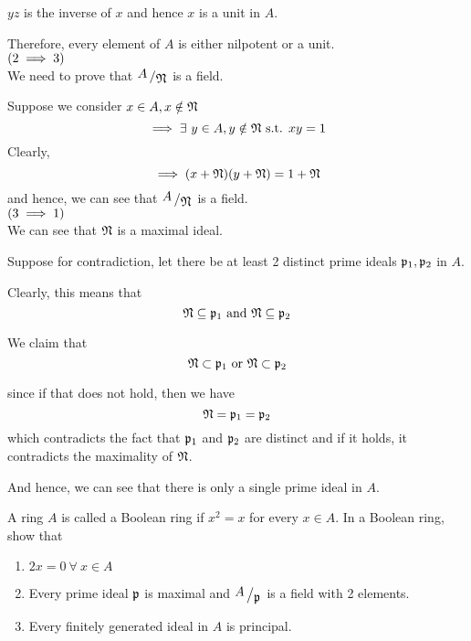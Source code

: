\(yz\) is the inverse of \(x\) and hence \(x\) is a unit in \(A\).

Therefore, every element of \(A\) is either nilpotent or a unit. \\


\(\left( 2 \implies 3 \right)\) \\
We need to prove that \(\bigslant{A}{\mfN}\) is a field.

Suppose we consider \(x \in A, x \notin \mathfrak{N}\)
\[
	\implies \exists\ y \in A, y \notin \mathfrak{N} \text{ s.t. } xy = 1
\]
Clearly,
\[
	\implies (x + \mathfrak{N})(y + \mathfrak{N}) = 1 + \mathfrak{N}
\]
and hence, we can see that \(\bigslant{A}{\mfN}\) is a field. \\


\(\left( 3 \implies 1 \right)\) \\
We can see that \(\mathfrak{N}\) is a maximal ideal.

Suppose for contradiction, let there be at least 2 distinct prime ideals
\( \mathfrak{p}_1, \mathfrak{p}_2 \) in \(A\).

Clearly, this means that
\[
	\mathfrak{N} \subseteq \mathfrak{p}_1 \text{ and } \mathfrak{N} \subseteq \mathfrak{p}_2
\]

We claim that
\[
	\mathfrak{N} \subset \mathfrak{p}_1 \text{ or } \mathfrak{N} \subset \mathfrak{p}_2
\]

since if that does not hold, then we have
\[
	\mathfrak{N} = \mathfrak{p}_1 = \mathfrak{p}_2
\]
which contradicts the fact that \( \mathfrak{p}_1 \) and \( \mathfrak{p}_2 \) are distinct
and if it holds, it contradicts the maximality of \(\mathfrak{N}\).

And hence, we can see that there is only a single prime ideal in \(A\).


\begin{exercise}{}{}
	A ring \(A\) is called a Boolean ring if \(x^2 = x\) for every
	\(x \in A\).
	In a Boolean ring, show that
	\begin{enumerate}
		\item \(2x = 0 \ \forall\ x \in A\)
		\item Every prime ideal \(\mathfrak{p}\) is maximal and
		\(\bigslant{A}{\mfp}\) is a field with 2 elements.
		\item Every finitely generated ideal in \(A\) is principal.
	\end{enumerate}
\end{exercise}


